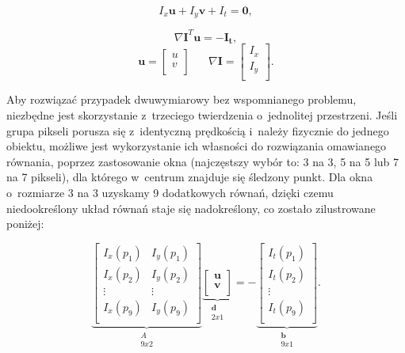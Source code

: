     \[ I_{x}\mathbf{u} + I_{y}\mathbf{v} + I_{t} = \mathbf{0}, \]

    \[ \nabla \mathbf{I}^{T} \mathbf{u} = -\mathbf{I_{t}}, \]
    \[
      \mathbf{u} =
        \begin{bmatrix}
          u \\
          v \\
        \end{bmatrix}
      \hspace{20pt}
      \nabla \mathbf{I} =
        \begin{bmatrix}
          I_{x} \\
          I_{y} \\
        \end{bmatrix}.
    \]

    Aby rozwiązać przypadek dwuwymiarowy bez wspomnianego problemu, niezbędne jest skorzystanie z~trzeciego twierdzenia o~jednolitej przestrzeni. Jeśli grupa pikseli porusza się z~identyczną prędkością i~należy fizycznie do jednego obiektu, możliwe jest wykorzystanie ich własności do rozwiązania omawianego równania, poprzez zastosowanie okna (najczęstszy wybór to: 3 na 3, 5 na 5 lub 7 na 7 pikseli), dla którego w~centrum znajduje się śledzony punkt. Dla okna o~rozmiarze 3 na 3 uzyskamy 9 dodatkowych równań, dzięki czemu niedookreślony układ równań staje się nadokreślony, co zostało zilustrowane poniżej:

    \[
      \underbrace{
        \begin{bmatrix}
          I_{x}(p_{1}) & I_{y}(p_{1}) \\
          I_{x}(p_{2}) & I_{y}(p_{2}) \\
          \vdots       & \vdots       \\
          I_{x}(p_{9}) & I_{y}(p_{9}) \\
        \end{bmatrix}}_{\substack{A\\9x2}}
      \underbrace{
        \begin{bmatrix}
          \mathbf{u} \\
          \mathbf{v} \\
        \end{bmatrix}}_{\substack{\mathbf{d}\\2x1}} =
      -\underbrace{
        \begin{bmatrix}
          I_{t}(p_{1}) \\
          I_{t}(p_{2}) \\
          \vdots       \\
          I_{t}(p_{9}) \\
        \end{bmatrix}}_{\substack{\mathbf{b}\\9x1}}.
    \]

